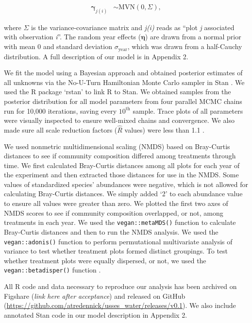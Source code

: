 \documentclass[fleqn,10pt,lineno]{wlpeerj} %
\begin{document}
\begin{align}
\boldsymbol{\gamma}_{j(i)} &\sim \text{MVN} \left( 0, \Sigma  \right),
\end{align}

\noindent{}where \(\Sigma\) is the variance-covariance matrix and
\emph{j(i)} reads as ``plot \emph{j} associated with observation
\emph{i}''. The random year effects (\(\boldsymbol{\eta}\)) are drawn
from a normal prior with mean 0 and standard deviation
\(\sigma_{\text{year}}\), which was drawn from a half-Cauchy
distribution. A full description of our model is in Appendix 2.

We fit the model using a Bayesian approach and obtained posterior
estimates of all unknowns via the No-U-Turn Hamiltonian Monte Carlo
sampler in Stan \citep{stan2016}. We used the R package `rstan'
\citep{rstan2016} to link R \citep{R2016} to Stan. We obtained samples
from the posterior distribution for all model parameters from four
parallel MCMC chains run for 10,000 iterations, saving every
\(10^{\text{th}}\) sample. Trace plots of all parameters were visually
inspected to ensure well-mixed chains and convergence. We also made sure
all scale reduction factors (\(\hat{R}\) values) were less than 1.1
\citep{Gelman2009}.

We used nonmetric multidimensional scaling (NMDS) based on Bray-Curtis
distances to see if community composition differed among treatments
through time. We first calculated Bray-Curtis distances among all plots
for each year of the experiment and then extracted those distances for
use in the NMDS. Some values of standardized species' abundances were
negative, which is not allowed for calculating Bray-Curtis distances. We
simply added `2' to each abundance value to ensure all values were
greater than zero. We plotted the first two axes of NMDS scores to see
if community composition overlapped, or not, among treatments in each
year. We used the \texttt{vegan::metaMDS()} function \citep{Oksanen2016}
to calculate Bray-Curtis distances and then to run the NMDS analysis. We
used the \texttt{vegan::adonis()} function \citep{Oksanen2016} to
perform permutational multivariate analysis of variance to test whether
treatment plots formed distinct groupings. To test whether treatment
plots were equally dispersed, or not, we used the
\texttt{vegan::betadisper()} function \citep{Oksanen2016}.

All R code and data necessary to reproduce our analysis has been
archived on Figshare (\emph{link here after acceptance}) and released on
GitHub (\url{https://github.com/atredennick/usses_water/releases/v0.1}).
We also include annotated Stan code in our model description in Appendix
2.
\end{document}

